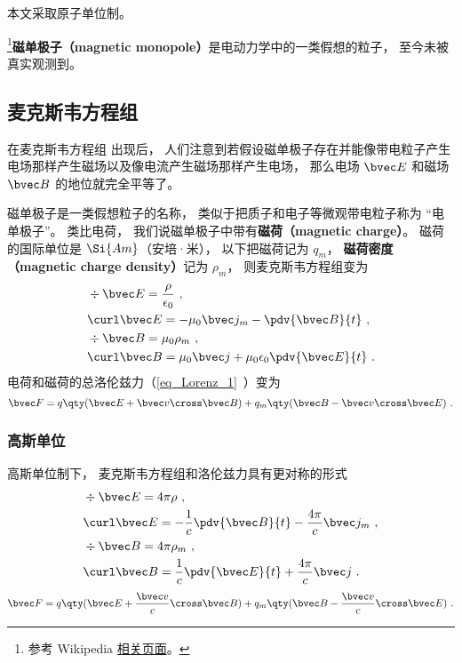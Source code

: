 

本文采取原子单位制。

\footnote{参考 Wikipedia \href{https://en.wikipedia.org/wiki/Magnetic_monopole}{相关页面}。}\textbf{磁单极子（magnetic monopole）}是电动力学中的一类假想的粒子， 至今未被真实观测到。

\subsection{麦克斯韦方程组}

 在麦克斯韦方程组 出现后， 人们注意到若假设磁单极子存在并能像带电粒子产生电场那样产生磁场以及像电流产生磁场那样产生电场， 那么电场 $\bvec E$ 和磁场 $\bvec B$ 的地位就完全平等了。

磁单极子是一类假想粒子的名称， 类似于把质子和电子等微观带电粒子称为 “电单极子”。 类比电荷， 我们说磁单极子中带有\textbf{磁荷（magnetic charge）}。 磁荷的国际单位是 $\Si{Am}$（安培·米）， 以下把磁荷记为 $q_m$， \textbf{磁荷密度（magnetic charge density）}记为 $\rho_m$， 则麦克斯韦方程组变为
\begin{equation}
\begin{aligned}
&\div \bvec E = \frac{\rho}{\epsilon_0}~,\\
&\curl \bvec E = - \mu_0 \bvec j_m -\pdv{\bvec B}{t}~,\\
&\div \bvec B = \mu_0 \rho_m~,\\
&\curl \bvec B = \mu_0 \bvec j + \mu_0\epsilon_0 \pdv{\bvec E}{t}~.
\end{aligned}
\end{equation}
电荷和磁荷的总洛伦兹力（\autoref{eq_Lorenz_1}~）变为
\begin{equation}
\bvec F = q \qty(\bvec E + \bvec v \cross \bvec B) +
q_m \qty(\bvec B - \bvec v \cross \bvec E)~.
\end{equation}


\subsubsection{高斯单位}
高斯单位制下， 麦克斯韦方程组和洛伦兹力具有更对称的形式
\begin{equation}\label{eq_BMono_1}
\begin{aligned}
&\div \bvec E = 4\pi\rho~,\\
&\curl \bvec E = -\frac{1}{c}\pdv{\bvec B}{t}  - \frac{4\pi}{c}\bvec j_m~,\\
&\div \bvec B = 4\pi\rho_m~,\\
&\curl \bvec B = \frac{1}{c}\pdv{\bvec E}{t} + \frac{4\pi}{c} \bvec j~.
\end{aligned}
\end{equation}
\begin{equation}
\bvec F = q \qty(\bvec E + \frac{\bvec v}{c}\cross \bvec B) + q_m \qty(\bvec B - \frac{\bvec v}{c}\cross \bvec E)~.
\end{equation}

